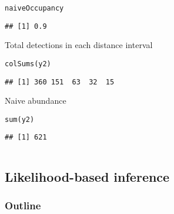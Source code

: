 \documentclass[color=usenames,dvipsnames]{beamer}\usepackage[]{graphicx}\usepackage[]{xcolor}
\makeatletter
\newcommand{\hlstd}[1]{\textcolor[rgb]{0,0,0}{#1}}%
\newcommand{\hlkwd}[1]{\textcolor[rgb]{0.004,0.004,0.506}{#1}}%
\newenvironment{kframe}{%
 \def\at@end@of@kframe{}%
 \ifinner\ifhmode%
  \def\at@end@of@kframe{\end{minipage}}%
  \begin{minipage}{\columnwidth}%
 \fi\fi%
 \def\FrameCommand##1{\hskip\@totalleftmargin \hskip-\fboxsep
 \colorbox{shadecolor}{##1}\hskip-\fboxsep
     \hskip-\linewidth \hskip-\@totalleftmargin \hskip\columnwidth}%
 \MakeFramed {\advance\hsize-\width
   \@totalleftmargin\z@ \linewidth\hsize
   \@setminipage}}%
 {\par\unskip\endMakeFramed%
 \at@end@of@kframe}
\newenvironment{knitrout}{}{} %
\makeatother
\begin{document}
\begin{frame}[fragile]
\begin{columns}
\begin{column}{0.6\textwidth}
\begin{knitrout}
\begin{kframe}
\begin{alltt}
\hlstd{naiveOccupancy}
\end{alltt}
\begin{verbatim}
## [1] 0.9
\end{verbatim}
\end{kframe}
\end{knitrout}
  \pause
  \vfill
  \small
  Total detections in each distance interval
  \vspace{-6pt}
\begin{knitrout}\scriptsize
{}\color{fgcolor}\begin{kframe}
\begin{alltt}
\hlkwd{colSums}\hlstd{(y2)}
\end{alltt}
\begin{verbatim}
## [1] 360 151  63  32  15
\end{verbatim}
\end{kframe}
\end{knitrout}
  \pause
  \vfill
  Naive abundance
  \vspace{-6pt}
\begin{knitrout}\scriptsize
{}\color{fgcolor}\begin{kframe}
\begin{alltt}
\hlkwd{sum}\hlstd{(y2)}
\end{alltt}
\begin{verbatim}
## [1] 621
\end{verbatim}
\end{kframe}
\end{knitrout}
  \end{column}
  \end{columns}
\end{frame}






\subsection{Likelihood-based inference}


\begin{frame}
  \frametitle{Outline}
  \Large
  \tableofcontents[currentsection]
\end{frame}
\end{document}
